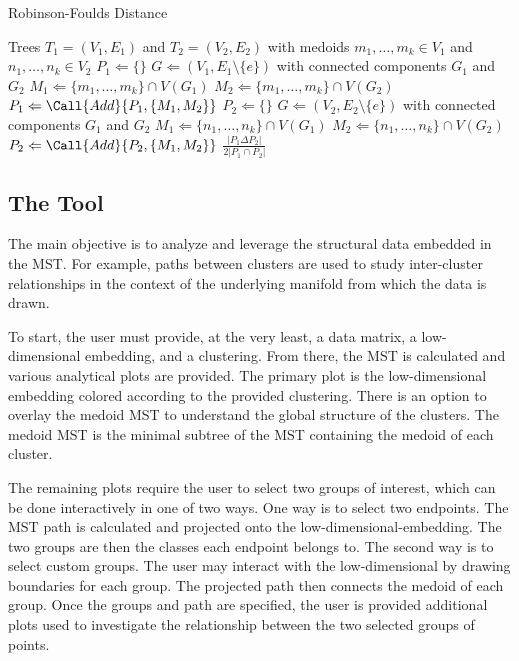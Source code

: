 \documentclass{article}
\begin{document}
\begin{algorithm}[H]
\caption{Robinson-Foulds Distance}\label{algo2}
\begin{algorithmic}[2]
\Require Trees $T_1 = (V_1,E_1)$ and $T_2 = (V_2, E_2)$ with medoids $m_1, \hdots, m_k \in V_1$ and $n_1, \hdots, n_k \in V_2$
\State $P_1 \Leftarrow \{\}$
	\State $G \Leftarrow (V_1, E_1 \setminus \{e\})$ with connected components $G_1$ and $G_2$
	\State $M_1 \Leftarrow \{m_1,\hdots,m_k\} \cap V(G_1)$
	\State $M_2 \Leftarrow \{m_1,\hdots,m_k\} \cap V(G_2)$
	\State $P_1 \Leftarrow \Call{Add}{P_1, \{M_1, M_2\}}$
\EndFor
\State $P_2 \Leftarrow \{\}$
	\State $G \Leftarrow (V_2, E_2 \setminus \{e\})$ with connected components $G_1$ and $G_2$
	\State $M_1 \Leftarrow \{n_1,\hdots,n_k\} \cap V(G_1)$
	\State $M_2 \Leftarrow \{n_1,\hdots,n_k\} \cap V(G_2)$
	\State $P_2 \Leftarrow \Call{Add}{P_2, \{M_1, M_2\}}$
\EndFor
\State \Output $\frac{\left|P_1 \Delta P_2 \right|}{2\left| P_1 \cap P_2 \right|}$
\end{algorithmic}
\end{algorithm}

\subsection{The Tool}
The main objective is to analyze and leverage the structural data embedded in the MST. For example, paths between clusters are used to study inter-cluster relationships in the context of the underlying manifold from which the data is drawn.

To start, the user must provide, at the very least, a data matrix, a low-dimensional embedding, and a clustering. From there, the MST is calculated and various analytical plots are provided. The primary plot is the low-dimensional embedding colored according to the provided clustering. There is an option to overlay the medoid MST to understand the global structure of the clusters. The medoid MST is the minimal subtree of the MST containing the medoid of each cluster.

The remaining plots require the user to select two groups of interest, which can be done interactively in one of two ways. One way is to select two endpoints. The MST path is calculated and projected onto the low-dimensional-embedding. The two groups are then the classes each endpoint belongs to. The second way is to select custom groups. The user may interact with the low-dimensional by drawing boundaries for each group. The projected path then connects the medoid of each group. Once the groups and path are specified, the user is provided additional plots used to investigate the relationship between the two selected groups of points.
\end{document}
